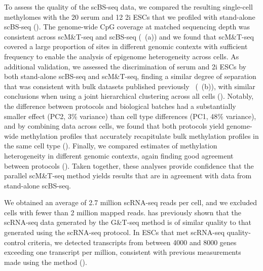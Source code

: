 To assess the quality of the scBS-seq data, we compared the resulting single-cell methylomes with the 20 serum and 12 2i ESCs that we profiled with stand-alone scBS-seq (). The genome-wide CpG coverage at matched sequencing depth was consistent across scM\&T-seq and scBS-seq (~(a)) and we found that scM\&T-seq covered a large proportion of sites in different genomic contexts with sufficient frequency to enable the analysis of epigenome heterogeneity across cells. As additional validation, we assessed the discrimination of serum and 2i ESCs by both stand-alone scBS-seq and scM\&T-seq, finding a similar degree of separation that was consistent with bulk datasets published previously~\citep{ficz_fgf_2013} (~(b)), with similar conclusions when using a joint hierarchical clustering across all cells (). Notably, the difference between protocols and biological batches had a substantially smaller effect (PC2, 3\% variance) than cell type differences (PC1, 48\% variance), and by combining data across cells, we found that both protocols yield genome-wide methylation profiles that accurately recapitulate bulk methylation profiles in the same cell type (). Finally, we compared estimates of methylation heterogeneity in different genomic contexts, again finding good agreement between protocols (). Taken together, these analyses provide confidence that the parallel scM\&T-seq method yields results that are in agreement with data from stand-alone scBS-seq.

We obtained an average of 2.7 million scRNA-seq reads per cell, and we excluded cells with fewer than 2 million mapped reads. \citet{macaulay_g&t-seq:_2015} has previously shown that the scRNA-seq data generated by the G\&T-seq method is of similar quality to that generated using the scRNA-seq protocol. In ESCs that met scRNA-seq quality-control criteria, we detected transcripts from between 4000 and 8000 genes exceeding one transcript per million, consistent with previous measurements made using the method ().

